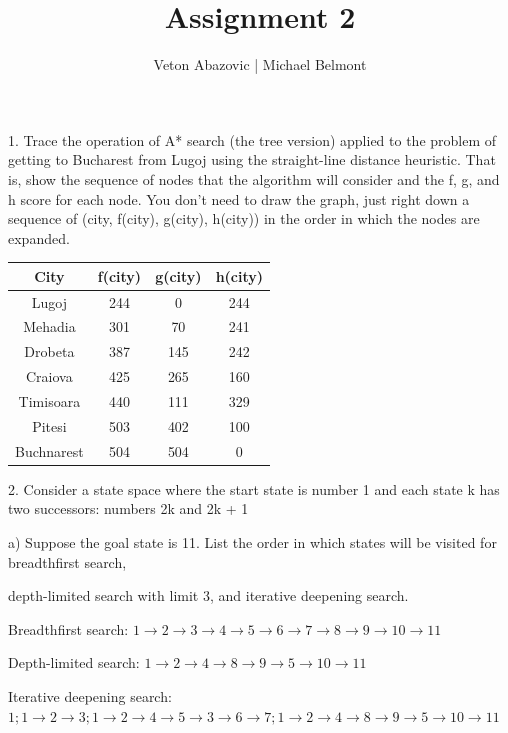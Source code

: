 \documentclass{article}
\author{Veton Abazovic | Michael Belmont}
\title{\vspace{-1.5cm}            %
Assignment 2}
\begin{document}
\maketitle
\setlength{\parindent}{0pt}
1.	Trace the operation of A* search (the tree version) applied to the problem of getting to Bucharest from Lugoj using the straight-line distance heuristic. That is, show the sequence of nodes that the algorithm will consider and the f, g, and h score for each node. You don’t need to draw the graph, just right down a sequence of (city, f(city), g(city), h(city)) in the order in which the nodes are expanded.
\begin{center}
 \begin{tabular}{||c c c c||} 
 \hline
 City & f(city) & g(city) & h(city) \\ [0.5ex] 
 \hline\hline
 Lugoj & 244 & 0 & 244 \\ 
 \hline
 Mehadia & 301 & 70 & 241 \\
 \hline
 Drobeta & 387 & 145 & 242 \\
 \hline
 Craiova & 425 & 265 & 160 \\
 \hline
 Timisoara & 440 & 111 & 329 \\
 \hline
 Pitesi & 503 & 402 & 100 \\ 
 \hline
 Buchnarest & 504 & 504 & 0 \\ [1ex] 
 \hline
\end{tabular}
\end{center}
\setlength{\parindent}{0pt}
\par 2.	Consider a state space where the start state is number 1 and each state k has two successors: numbers 2k and 2k + 1
\par
\setlength{\parindent}{30pt}
a) Suppose the goal state is 11. List the order in which states will be visited for breadthfirst search, 
\par
depth-limited search with limit 3, and iterative deepening search.
\newline
\par
Breadthfirst search: $1\rightarrow 2 \rightarrow3 \rightarrow4 \rightarrow5 \rightarrow 6 \rightarrow 7 \rightarrow 8 \rightarrow 9 \rightarrow10 \rightarrow 11$
\par
Depth-limited search: $1\rightarrow 2 \rightarrow4 \rightarrow8 \rightarrow9 \rightarrow 5 \rightarrow10 \rightarrow 11$
\par
Iterative deepening search: $1;1\rightarrow 2 \rightarrow3;1 \rightarrow2 \rightarrow4 \rightarrow 5 \rightarrow 3 \rightarrow 6 \rightarrow 7;1 \rightarrow2 \rightarrow 4 \rightarrow 8 \rightarrow 9 \rightarrow 5\rightarrow 10 \rightarrow 11$
\end{document}
